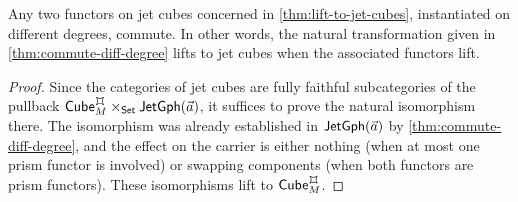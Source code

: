 \documentclass[a4paper]{memoir}
\begin{document}
%	
\begin{proposition} \label{thm:cube-commute-diff-degree}
	Any two functors on jet cubes concerned in \cref{thm:lift-to-jet-cubes}, instantiated on different degrees, commute.
	In other words, the natural transformation given in \cref{thm:commute-diff-degree} lifts to jet cubes when the associated functors lift.
\end{proposition}
\begin{proof}
	Since the categories of jet cubes are fully faithful subcategories of the pullback $\cubecat_M^\mycubex \times_\Set \jetgph{\vec a}$, it suffices to prove the natural isomorphism there.
	The isomorphism was already established in $\mathsf{JetGph}(\vec a)$ by \cref{thm:commute-diff-degree}, and the effect on the carrier is either nothing (when at most one prism functor is involved) or swapping components (when both functors are prism functors).
	These isomorphisms lift to $\cubecat_M^\mycubex$.
\end{proof}
\end{document}
